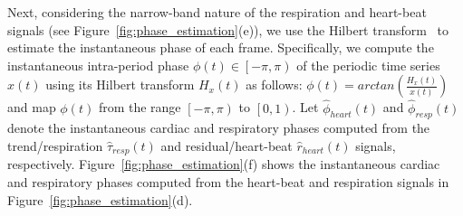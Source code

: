 \documentclass[runningheads,a4paper]{llncs}
\begin{document}
	Next, considering the narrow-band nature of the respiration and heart-beat signals (see  Figure~\ref{fig:phase_estimation}(e)), we use the Hilbert transform~\cite{Lu2013} to estimate the instantaneous phase of each frame. Specifically, we compute the instantaneous intra-period phase $\phi(t) \in \left [  -\pi, \pi\right )$ of the periodic time series $x(t)$ using its Hilbert transform $H_x(t)$ as follows: $\phi(t) = arctan \left( \frac{H_x(t)}{x(t)}\right)$ and map $\phi(t)$ from the range $\left [  -\pi, \pi\right )$ to $\left [  0, 1\right )$. Let $\hat{\phi}_{heart}(t)$ and $\hat{\phi}_{resp}(t)$ denote the instantaneous cardiac and respiratory phases computed from the trend/respiration $\hat{\tau}_{resp}(t)$ and residual/heart-beat $\hat{r}_{heart}(t)$ signals, respectively. Figure~\ref{fig:phase_estimation}(f) shows the instantaneous cardiac and respiratory phases computed from the heart-beat and respiration signals in Figure~\ref{fig:phase_estimation}(d). 
%
\vspace{-0.3cm}
\end{document}
